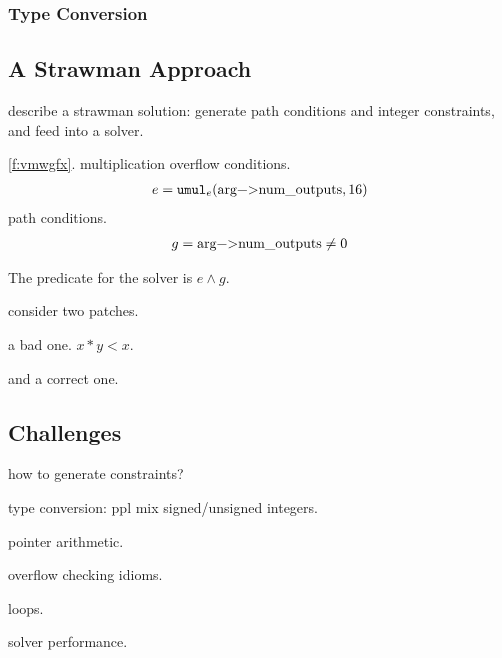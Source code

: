 \subsubsection*{Type Conversion}


\subsection{A Strawman Approach}

describe a strawman solution:
generate path conditions and integer constraints,
and feed into a solver.

\autoref{f:vmwgfx}.
multiplication overflow conditions.
\begin{align*}
e = \umule(\text{\lstinline!arg->num_outputs!}, 16)
\end{align*}
path conditions.
\begin{align*}
g = \text{\lstinline!arg->num_outputs!} \neq 0
\end{align*}

The predicate for the solver is $e \land g$.

consider two patches.

a bad one.
$x * y < x$.

and a correct one.

\subsection{Challenges}

how to generate constraints?

type conversion: ppl mix signed/unsigned integers.

pointer arithmetic.

overflow checking idioms.

loops.

solver performance.
